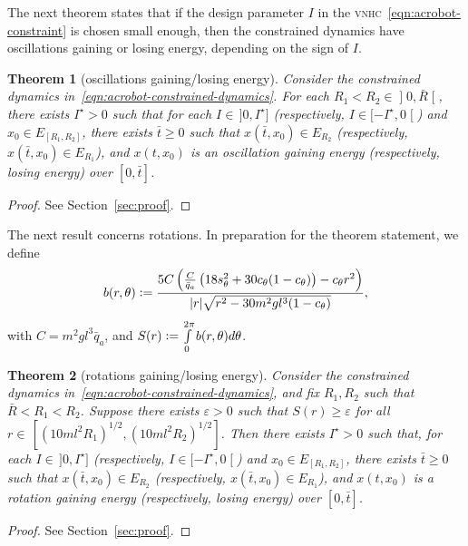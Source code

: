 \documentclass[journal,twoside,web, twocolumn,draftcls]{ieeecolor}
\newtheorem{thm}{Theorem}%
\newcommand*{\eqdef}{\vcentcolon=}
\newcommand*{\vnhc}{\textsc{vnhc}\xspace}
\begin{document}
The next theorem states that if the design parameter $I$ in the \vnhc~\eqref{eqn:acrobot-constraint} is chosen small enough, then the constrained dynamics have oscillations gaining or losing energy, depending on the sign of $I$.


\begin{thm}[oscillations gaining/losing energy]\label{thm:acrobot-oscillations}
 Consider the constrained dynamics in~\eqref{eqn:acrobot-constrained-dynamics}. For each $R_1<R_2 \in \mathopen] 0, \bar R \mathclose[$, there exists \(I^\star > 0\) such that for each \(I \in \, ]0,I^\star]\) (respectively, $I \in [-I^\star,0\mathclose[$) and $x_0 \in E_{[R_1,R_2]}$, there exists $\bar t\geq 0$ such that $x(\bar t,x_0) \in E_{R_2}$ (respectively, $x(\bar t, x_0) \in E_{R_1}$), and $x(t,x_0)$ is an oscillation gaining energy (respectively, losing energy) over $[0, \bar t]$. 
\end{thm}

\begin{proof}
 See Section~\ref{sec:proof}.
\end{proof}

The next result concerns rotations.  In preparation for the theorem statement, we define 
    \[
        b(r,\theta) \eqdef 
        \frac{5C \left(
        \frac{C}{\bar{q}_a}\left(18s_\theta^2 + 30c_\theta(1 - c_\theta)\right)
            - c_\theta r^2
        \right)}{
        | r|\sqrt{ r^2 - 30m^2gl^3(1 - c_\theta)}
        },
\]
with \(C = m^2gl^3\bar{q}_a\), and 
        \(S( r) \eqdef \int \limits_{0}^{2\pi} b(r,\theta)d\theta\).


\begin{thm}[rotations gaining/losing energy]\label{thm:acrobot-rotations}
    Consider the constrained dynamics
    in~\eqref{eqn:acrobot-constrained-dynamics}, and fix $R_1, R_2$ such that
    \(\bar R<R_1<R_2\). Suppose there exists \(\varepsilon > 0\) such that \(S(
    r) \geq \varepsilon\) for all \( r \in \, [(10 m l^2 R_1)^{1/2}, (10 m l^2
    R_2)^{1/2}]\). Then there exists \(I^{\star}>0\) such that, for each \(I \in
    \, ]0,I^{\star}]\) (respectively, $I \in [-I^\star,0\mathclose[$) and $x_0
    \in E_{[R_1,R_2]}$, there exists $\bar t \geq 0$ such that $x(\bar t,x_0)
    \in E_{R_2}$  (respectively, $x(\bar t, x_0) \in E_{R_1}$), and $x(t,x_0)$
    is a rotation gaining energy (respectively, losing energy) over $[0, \bar
    t]$. 
\end{thm}
\begin{proof}
See Section~\ref{sec:proof}.
\end{proof}
\end{document}

